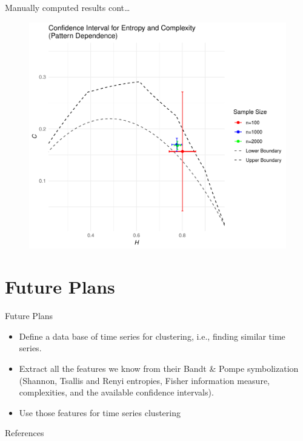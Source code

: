 \documentclass{beamer}
\begin{document}
\begin{frame}{Manually computed results cont\dots}
	\begin{figure}[hbt]
		\centering
		\includegraphics[width=0.7 \textwidth]{CI for pattern dependence}
		\end{figure}
\end{frame}


\section{Future Plans}

\begin{frame}{Future Plans}
    \begin{itemize}
        \item Define a data base of time series for clustering, i.e., finding similar time series.
        \item Extract all the features we know from their Bandt \& Pompe symbolization (Shannon, Tsallis and Renyi entropies, Fisher information measure, complexities, and the available confidence intervals).
        \item Use those features for time series clustering
    \end{itemize}
\end{frame}

\begin{frame}[allowframebreaks]{References}
    
    
    
\end{frame}
\end{document}
